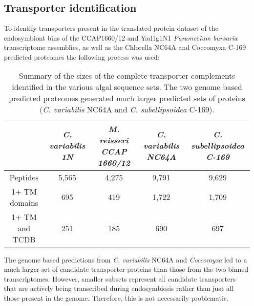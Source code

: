 \subsection{Transporter identification}
To identify transporters present in the translated protein dataset of the 
endosymbiont bins of the CCAP1660/12 and Yad1g1N1 
\textit{Paramecium bursaria} transcriptome assemblies, as well as the Chlorella NC64A 
and Coccomyxa C-169 predicted proteomes the following process was used:

\begin{table}
    \centering
    \begin{tabular}{|c|c|c|c|c|}
        \hline
        & \textit{C. variabilis 1N} & \textit{M. reisseri CCAP 1660/12} & \textit{C. variabilis NC64A} & \textit{C. subellipsoidea C-169} \\
        \hline
        Peptides        & 5,565 & 4,275 & 9,791 & 9,629 \\
        1+ TM domains   &   695 &   419 & 1,722 & 1,709 \\
        1+ TM and TCDB  &   251 &   185 &   690 &   697 \\
        \hline
    \end{tabular}
    \caption[Summary of Predicted Transporters Across Algal Sequences]{Summary
        of the sizes of the complete transporter complements identified in the 
        various algal sequence sets. The two genome based predicted proteomes
        generated much larger predicted sets of proteins (\textit{C. variabilis} NC64A
    and \textit{C. subellipsoidea} C-169).}
\end{table}

The genome based predictions from \textit{C. variabilis} NC64A and \textit{Coccomyxa}
led to a much larger set of candidate
transporter proteins than those from the two binned transcriptomes.
However, smaller subsets represent all 
candidate transporters
that are actively being transcribed during endosymbiosis rather than just
all those present in the genome. Therefore, this is not necessarily problematic.



